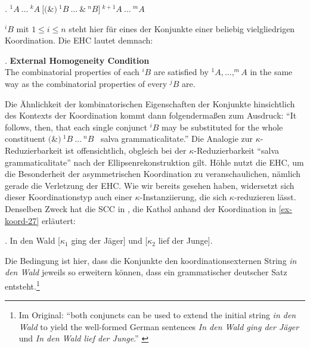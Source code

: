 \ex. \label{ex-hoehle-90-1} $^1\!A \ \ldots \ ^k\!A \ [($\&$) \ ^1\!B \ \ldots \ \& \ ^n\!B] \ ^{k+1}\!A \ \ldots \ ^m\!A$ \hfill \citep[(1)]{Hoehle:90}

$^i\!B$ mit $1 \leq i \leq n$ steht hier für eines der Konjunkte einer beliebig vielgliedrigen Koordination. Die EHC lautet demnach: 

\ex. \label{ex-hoehle-90-3}
{\bf External Homogeneity Condition} \hfill \citep[(3)]{Hoehle:90} \\
The combinatorial properties of each $^i\!B$ are satisfied by $^1\!A , \ldots , ^m\!A$ in the same way as the combinatorial properties of every $^j\!B$ are.

\largerpage%
Die Ähnlichkeit der kombinatorischen Eigenschaften der Konjunkte hinsichtlich des Kontexts der Koordination kommt dann folgenderma\ss en zum Ausdruck: "`It follows, then, that each single conjunct $^i\!B$ may be substituted for the whole constituent \glq$($\&$) \ ^1\!B \ \ldots \ ^n\!B$\grq~ salva grammaticalitate."' \citep[222]{Hoehle:90} Die Analogie zur $\kappa$-Reduzierbarkeit ist offensichtlich, obgleich bei der $\kappa$-Reduzierbarkeit "`salva grammaticalitate"' nach der Ellipsenrekonstruktion gilt. Höhle nutzt die EHC, um die Besonderheit der asymmetrischen Koordination zu veranschaulichen, nämlich gerade die Verletzung der EHC. Wie wir bereits gesehen haben, widersetzt sich dieser Koordinationstyp auch einer $\kappa$-Instanziierung, die sich $\kappa$-reduzieren lässt. Denselben Zweck hat die SCC in \cite{Kathol:99}, die Kathol anhand der Koordination in \ref{ex-koord-27} erläutert:

\ex. \label{ex-koord-27}In den Wald [$\kappa_1$ ging der Jäger] und [$\kappa_2$ lief der Junge].\hfill \citep[(1)]{Kathol:99}   

Die Bedingung ist hier, dass die Konjunkte den koordinationsexternen String {\it in den Wald} jeweils so erweitern können, dass ein grammatischer deutscher Satz entsteht.\footnote{Im Original: "`both conjuncts can be used to extend the initial string {\it in den Wald} to yield the well-formed German sentences {\it In den Wald ging der Jäger} und {\it In den Wald lief der Junge}."' \citep[305]{Kathol:99}} 

